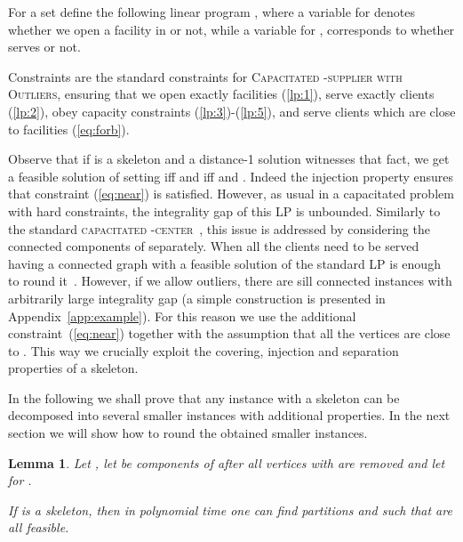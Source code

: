 \documentclass{article}
\newcommand{\fullsup}{\textsc{Capacitated} -\textsc{supplier with Outliers}}
\theoremstyle{plain}
\newtheorem{lemma}[theorem]{Lemma}
\theoremstyle{definition}
\begin{document}
For a set  define the following linear program
, where a variable  for  denotes whether
we open a facility in  or not, while
a variable  for , 
corresponds to whether  serves  or not.




Constraints 
are the standard constraints for \fullsup,
ensuring that we open exactly  facilities (\ref{lp:1}), 
serve exactly  clients (\ref{lp:2}),
obey capacity constraints (\ref{lp:3})-(\ref{lp:5}),
and serve clients which are close to facilities (\ref{eq:forb}).

Observe that if  is a skeleton and a distance-1 solution  witnesses
that fact, we get a feasible solution of  setting 
iff  and  iff  and .
Indeed the injection property ensures that constraint (\ref{eq:near}) is satisfied.
However, as usual in a capacitated problem with hard constraints, 
the integrality gap of this LP is unbounded.
Similarly to the standard \textsc{capacitated} -\textsc{center}~\cite{chk-focs12},
this issue is addressed by considering the connected components of 
separately. 
When all the clients need to be served having a connected graph
with a feasible solution of the standard LP is enough to round it~\cite{svensson,chk-focs12}.
However, if we allow outliers, there are sill connected instances with arbitrarily large integrality gap (a simple construction
is presented in Appendix~\ref{app:example}).
For this reason we use the additional constraint~(\ref{eq:near})
together with the assumption that all the vertices are close to .
This way we crucially exploit the 
covering, injection and separation properties of a skeleton.

In the following we shall prove that any instance 
with a skeleton can be decomposed into several smaller instances
with additional properties. In the next section we will show how
to round the obtained smaller instances.

\begin{lemma}\label{lem:dp}
Let , let  be components
of  after all vertices  with  are removed
and let  for .

If  is a skeleton, then in polynomial time one can find partitions 
and  such that  are all feasible.
\end{lemma}
\end{document}
